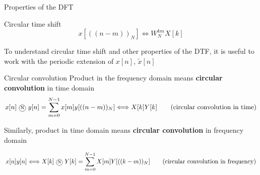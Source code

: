 \documentclass[10pt]{beamer}
\begin{document}
%
\begin{frame}{Properties of the DFT}
	\centering
\end{frame}

%
\begin{frame}{Circular time shift}
\begin{equation*}
	x[((n-m))_N] \Longleftrightarrow W_N^{km}X[k] \tag{circular time shift}
\end{equation*}

To understand circular time shift and other properties of the DTF, it is useful to work with the periodic extension of $x[n]$, $\tilde{x}[n]$

\begin{center}
	\resizebox{\textwidth}{!}{}
\end{center}
\end{frame}

%
\begin{frame}{Circular convolution}
	Product in the frequency domain means \textbf{circular convolution} in time domain
	\begin{equation*}
		x[n]~\encircle{N}~y[n] = \sum_{m=0}^{N-1} x[m]y[((n-m))_N] \Longleftrightarrow X[k]Y[k] \tag{circular convolution in time}
	\end{equation*}
	
	Similarly, product in time domain means \textbf{circular convolution} in frequency domain
	
	\begin{equation*}
	x[n]y[n] \Longleftrightarrow X[k]~\encircle{N}~Y[k] = \sum_{m=0}^{N-1} X[m]Y[((k-m))_N] \tag{circular convolution in frequency}
	\end{equation*}
\end{frame}
\end{document}
